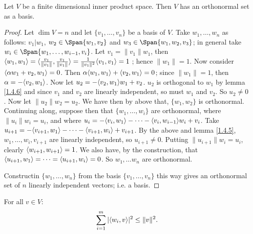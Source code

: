 \begin{theorem}
    Let $V$ be a finite dimensional inner product space. Then  $V$ has an orthonormal set as a
    basis.
\end{theorem}
\begin{proof}
    Let $\dim{V}=n$ and let $\{v_1, \dots, v_n\}$ be a basis of $V$. Take  $w_1 ,\dots, w_n$ as
    follows: $v_1|w_1$, $w_2 \in \Span\{w_1,v_2\}$ and $w_3 \in \Span\{w_1,w_2,v_3\}$; in general
    take $w_i \in \Span\{w_1, \dots, w_{i-1},v_i\}$. Let $v_1=\|v_1\|w_1$, then
    $\langle w_1,w_1\rangle=\langle \frac{v_1}{\|v_1\|},\frac{v_1}{\|v_1\|}\rangle=\frac{1}{\|v_1\|^2}\langle v_1,v_1\rangle=1$
    ; hence $\|w_1\|=1$. Now consider $\langle \alpha w_1+v_2,w_1\rangle=0$. Then
    $\alpha\langle w_1,w_1\rangle+\langle v_2,w_1\rangle=0$; since $\|w_1\|=1$, then $\alpha=-\langle v_2,w_1\rangle$.
    Now let $u_2=-\langle v_2,w_1\rangle w_1+v_2$. $u_2$ is orthogonal to $w_1$ by lemma \ref{1.4.6} and
    since $v_1$ and $v_2$ are linearly independent, so must $w_1$ and $v_2$. So $u_2 \neq 0$. Now
    let $\|u_2\|w_2=u_2$. We have then by above that, $\{w_1,w_2\}$ is orthonormal. Continuing
    along, suppose then that $\{w_1, \dots, w_i\}$ are orthonormal, where $\|u_i\|w_i=u_i$, and 
    where $u_i=-\langle v_i,w_1\rangle-\dots-\langle v_i,w_{i-1}\rangle w_i+v_i$. Take
    $u_{i+1}=-\langle v_{i+1},w_1\rangle-\dots-\langle v_{i+1},w_i\rangle+v_{i+1}$. By the above and lemma
    \ref{1.4.5}, $w_1 ,\dots, w_i,v_{i+1}$ are linearly independent, so $u_{i+1} \neq 0$. 
    Putting $\|u_{i+1}\|w_i=u_i$, clearly $\langle w_{i+1},w_{i+1}\rangle=1$. We also have, by the
    construction, that $\langle u_{i+1},w_1\rangle=\dots=\langle u_{i+1},w_i\rangle=0$. So $w_1, \dots w_n$ are
    orthonormal.

    Constructin $\{w_1, \dots, w_n\}$ from the basis $\{v_1, \dots, v_n\}$ this way gives an
    orthonormal set of $n$ linearly independent vectors; i.e. a basis.
\end{proof}

\begin{corollary}
    For all $v \in V$:
        \begin{equation}
            \sum_{i=1}^m{|\langle w_i,v\rangle|^2} \leq \|v\|^2.
        \end{equation} 
\end{corollary}

